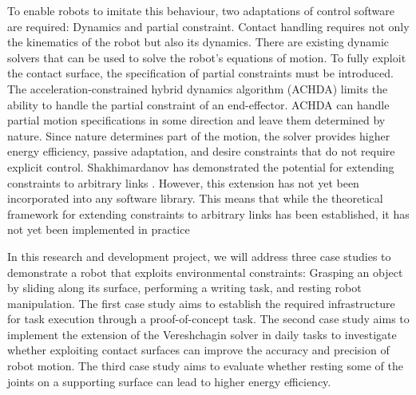 \documentclass[report.tex]{subfiles}
\begin{document}
    To enable robots to imitate this behaviour, two adaptations of control software are required: Dynamics and partial constraint. Contact handling requires not only the kinematics of the robot but also its dynamics. There are existing dynamic solvers that can be used to solve the robot’s equations of motion. To fully exploit the contact surface, the specification of partial constraints must be introduced. The acceleration-constrained hybrid dynamics algorithm (ACHDA) limits the ability to handle the partial constraint of an end-effector. ACHDA can handle partial motion specifications in some direction and leave them determined by nature. Since nature determines part of the motion, the solver provides higher energy efficiency, passive adaptation, and desire constraints that do not require explicit control. Shakhimardanov has demonstrated the potential for extending constraints to arbitrary links \cite{Shakhimardanov2015}. However, this extension has not yet been incorporated into any software library. This means that while the theoretical framework for extending constraints to arbitrary links has been established, it has not yet been implemented in practice
    
    In this research and development project, we will address three case studies to demonstrate a robot that exploits environmental constraints: Grasping an object by sliding along its surface, performing a writing task, and resting robot manipulation. The first case study aims to establish the required infrastructure for task execution through a proof-of-concept task. The second case study aims to implement the extension of the Vereshchagin solver in daily tasks to investigate whether exploiting contact surfaces can improve the accuracy and precision of robot motion. The third case study aims to evaluate whether resting some of the joints on a supporting surface can lead to higher energy efficiency.
\end{document}
